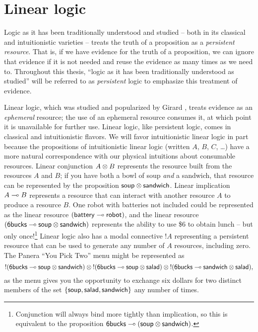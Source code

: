 
\chapter{Linear logic}

Logic as it has been traditionally understood and studied -- both in
its classical and intuitionistic varieties -- treats the truth of a
proposition as a {\it persistent resource}. That is, if we have
evidence for the truth of a proposition, we can ignore that evidence
if it is not needed and reuse the evidence as many times as we need
to. Throughout this thesis, ``logic as it has been traditionally
understood as studied'' will be referred to as {\it persistent} logic
to emphasize this treatment of evidence. 

Linear logic, which was studied and
popularized by Girard \cite{girard87linear},
treats evidence as an {\it ephemeral} resource; the use of an
ephemeral resource consumes it, at which point it is unavailable for
further use.  Linear logic, like persistent logic, comes in classical
and intuitionistic flavors. We will favor intuitionistic linear logic
in part because the propositions of intuitionistic linear logic
(written $A$, $B$, $C$, \ldots) have a more natural correspondence
with our physical intuitions about consumable resources. Linear
conjunction $A \otimes B$ represents the resource built from the
resources $A$ and $B$; if you have both a bowl of soup {\it and} a
sandwich, that resource can be represented by the proposition ${\sf
  soup} \otimes {\sf sandwich}$. Linear implication $A \multimap B$
represents a resource that can interact with another resource $A$ to
produce a resource $B$. One robot with batteries not included could be
represented as the linear resource $({\sf battery} \multimap {\sf
  robot})$, and the linear resource $({\sf 6bucks} \multimap {\sf soup}
\otimes {\sf sandwich})$ represents the ability to use \$6 to obtain
lunch -- but only once!\footnote{Conjunction will always bind more
  tightly than implication, so this is equivalent to the proposition
  ${\sf 6bucks} \multimap ({\sf soup} \otimes {\sf sandwich})$.} Linear
logic also has a modal connective ${!}A$ representing a persistent
resource that can be
used to generate any number of $A$ resources, including zero. The
Panera ``You Pick Two'' menu might be represented as
\[ {!}({\sf 6bucks} \multimap {\sf soup} \otimes {\sf sandwich}) \otimes
{!}({\sf 6bucks} \multimap {\sf soup} \otimes {\sf salad}) \otimes
{!}({\sf 6bucks} \multimap {\sf sandwich} \otimes {\sf salad}),\] as the
menu gives you the opportunity to exchange six dollars for two
distinct members of the set $\{ {\sf soup}, {\sf salad}, {\sf
  sandwich} \}$ any number of times.

